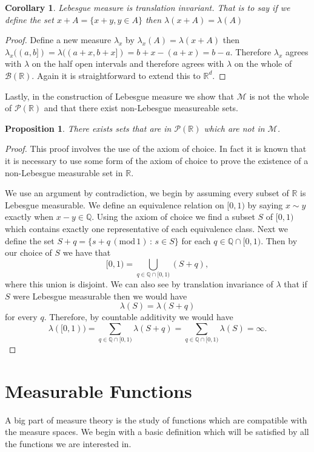 \documentclass[11pt]{article}
\newtheorem{cor}[thm]{Corollary}
\newtheorem{prp}[thm]{Proposition}
\theoremstyle{definition}
\theoremstyle{remark}
\begin{document}
\begin{cor}
Lebesgue measure is translation invariant. That is to say if we define the set $x+A = \{ x+y, y \in A\}$ then $\lambda(x+A) = \lambda(A)$
\end{cor}
\begin{proof}
Define a new measure $\lambda_x$ by $\lambda_x(A) = \lambda(x+A)$ then $\lambda_x((a,b]) = \lambda((a+x,b+x]) = b+x -(a+x) = b-a$. Therefore $\lambda_x$ agrees with $\lambda$ on the half open intervals and therefore agrees with $\lambda$ on the whole of $\mathcal{B}(\mathbb{R})$. Again it is straightforward to extend this to $\mathbb{R}^d$.
\end{proof}

Lastly, in the construction of Lebesgue measure we show that $\mathscr{M}$ is not the whole of $\mathscr{P}(\mathbb{R})$ and that there exist non-Lebesgue measureable sets.

\begin{prp}
There exists sets that are in $\mathscr{P}(\mathbb{R})$ which are not in $\mathscr{M}$.
\end{prp}
\begin{proof}
This proof involves the use of the axiom of choice. In fact it is known that it is necessary to use some form of the axiom of choice to prove the existence of a non-Lebesgue measurable set in $\mathbb{R}$.

We use an argument by contradiction, we begin by assuming every subset of $\mathbb{R}$ is Lebesgue measurable. We define an equivalence relation on $[0,1)$ by saying $x \sim y$ exactly when $x-y \in \mathbb{Q}$.  Using the axiom of choice we find a subset $S$ of $[0,1)$ which contains exactly one representative of each equivalence class. Next we define the set $S+q = \{ s+q \, (\mbox{mod}\,1) \, : \, s \in S \}$ for each $q \in \mathbb{Q} \cap [0,1)$. Then by our choice of $S$ we have that 
\[ [0,1) = \bigcup_{q \in \mathbb{Q} \cap [0,1)} (S+q), \] where this union is disjoint. We can also see by translation invariance of $\lambda$ that if $S$ were Lebesgue measurable then we would have
\[ \lambda(S) = \lambda(S+q) \] for every $q$. Therefore, by countable additivity we would have
\[ \lambda([0,1)) = \sum_{q \in \mathbb{Q} \cap [0,1)} \lambda (S+q) = \sum_{q \in \mathbb{Q} \cap [0,1)} \lambda(S) = \infty. \]
\end{proof}






\section{Measurable Functions}
A big part of measure theory is the study of functions which are compatible with the measure spaces. We begin with a basic definition which will be satisfied by all the functions we are interested in.
\end{document}
